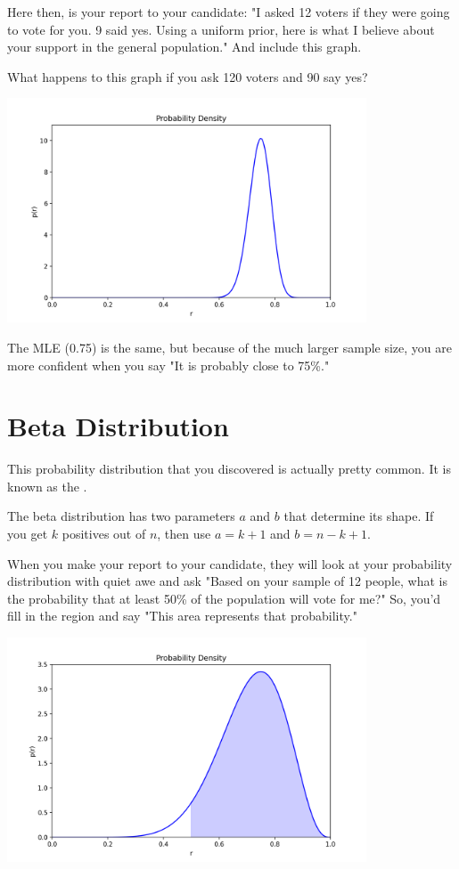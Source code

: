 Here then,  is your report to your candidate: "I asked 12 voters if they were going to vote for you.  9 said yes.  Using a uniform prior,  here is what I believe about your support in the general 
population."  And include this graph.

What happens to this graph if you ask 120 voters and 90 say yes?

\includegraphics[width=0.8\textwidth]{bayes_tight.png}

The MLE (0.75) is the same,  but because of the much larger sample size,   you are more confident when you say "It is probably close to 75\%."

\section{Beta Distribution}

This probability distribution that you discovered is actually pretty common.  It is known as the .   

The beta distribution has two parameters $a$ and $b$ that determine its shape.  If you get $k$ positives out of $n$,  then use $a = k +1$ and $b = n - k + 1$.

When you make your report to your candidate,  they will look at your probability distribution with quiet awe and ask "Based on your sample of 12 people, what is the probability that at least 50\% of the population will vote for me?"  So,  you'd fill in the region and say "This area represents that probability."

\includegraphics[width=0.8\textwidth]{bayes50.png}

